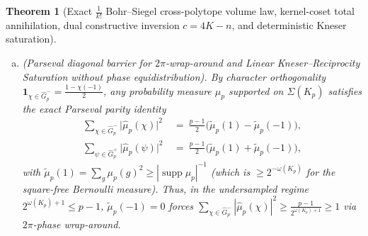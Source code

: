 \documentclass[11pt, a4paper]{article}
\theoremstyle{plain}
\newtheorem{theorem}{Theorem}[section]
\theoremstyle{definition}
\begin{document}
\begin{theorem}[Exact $\frac{1}{k!}$ Bohr--Siegel cross-polytope volume law, kernel-coset total annihilation, dual constructive inversion $c=4K-n$, and deterministic Kneser saturation]
\begin{enumerate}[(a)]
    \item \emph{(Parseval diagonal barrier for $2\pi$-wrap-around and Linear Kneser--Reciprocity Saturation without phase equidistribution).} By character orthogonality $\mathbf{1}_{\chi\in\widehat{G}_p^{-}}=\frac{1-\chi(-1)}{2}$, any probability measure $\mu_p$ supported on $\Sigma(K_p)$ satisfies the exact Parseval parity identity
    \begin{equation}\label{eq:parseval_diagonal_parity_barrier}
    \begin{split}
    \sum_{\chi\in\widehat{G}_p^{-}}\big|\widehat{\mu}_p(\chi)\big|^{2}\ &=\ \frac{p-1}{2}\big(\widetilde{\mu}_p(1)-\widetilde{\mu}_p(-1)\big),\\
    \sum_{\psi\in\widehat{G}_p^{+}}\big|\widehat{\mu}_p(\psi)\big|^{2}\ &=\ \frac{p-1}{2}\big(\widetilde{\mu}_p(1)+\widetilde{\mu}_p(-1)\big),
    \end{split}
    \end{equation}
    with $\widetilde{\mu}_p(1)=\sum_g\mu_p(g)^{2}\ge|\operatorname{supp}\mu_p|^{-1}$ (which is $\ge 2^{-\omega(K_p)}$ for the square-free Bernoulli measure). Thus, in the undersampled regime $2^{\omega(K_p)+1}\le p-1$, $\widetilde{\mu}_p(-1)=0$ forces $\sum_{\chi\in\widehat{G}_p^{-}}\allowbreak|\widehat{\mu}_p(\chi)|^{2}\ge\allowbreak\frac{p-1}{2^{\omega(K_p)+1}}\ge 1$ via $2\pi$-phase wrap-around.


\end{enumerate}
\end{theorem}
\end{document}
